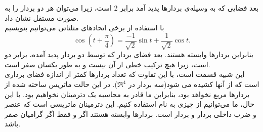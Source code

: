 \documentclass[a4paper,12pt]{report}
\begin{document}
  	    بعد فضایی که به وسیله‌ی بردارها پدید آمد برابر 2 است، زیرا می‌توان هر دو بردار را به صورت مستقل نشان داد.\\
  	    
  	    \textbf{}
  	    با استفاده از برخی اتحادهای مثلثاتی می‌توانیم بنویسیم
  	   $$
  	   \cos (t+\frac{\pi}{4})=
  	   \frac{-1}{\sqrt 2}\sin t+\frac{1}{\sqrt 2}\cos t.
  	   $$ 
  	   بنابراین بردارها وابسته هستند. بعد فضای بردار که توسط دو بردار پدید آمده، برابر دو است، زیرا هیچ ترکیب خطی از آن نیست و به طور یکسان صفر است.\\
  	   
  	   \textbf{}
  	   این شبیه قسمت  است، با این تفاوت که تعداد بردارها کمتر از اندازه فضای برداری است که از آنها کشیده می شود(سه بردار در $ \Re^4 $). در این حالت ماتریس ساخته شده از بردارها مربع نخواهد بود، بنابراین ما قادر به محاسبه یک دترمینان نخواهیم بود. با این حال، ما می‌توانیم از چیزی به نام  استفاده کنیم. این دترمینان ماتریسی است که عنصر  و  ضرب داخلی بردار  و بردار  است. بردارها وابسته هستند اگر و فقط اگر گرامیان صفر باشد.
  	   
\end{document}

